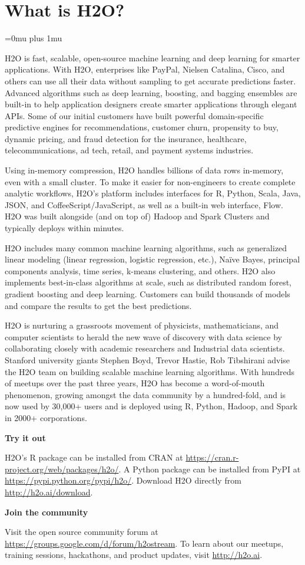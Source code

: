 \section{What is H2O?}
\Urlmuskip=0mu plus 1mu\relax %


H2O is fast, scalable, open-source machine learning and deep learning for smarter applications. With H2O, enterprises like PayPal, Nielsen Catalina, Cisco, and others can use all their data without sampling to get accurate predictions faster. Advanced algorithms such as deep learning, boosting, and bagging ensembles are built-in to help application designers create smarter applications through elegant APIs. Some of our initial customers have built powerful domain-specific predictive engines for recommendations, customer churn, propensity to buy, dynamic pricing, and fraud detection for the insurance, healthcare, telecommunications, ad tech, retail, and payment systems industries.

Using in-memory compression, H2O handles billions of data rows in-memory, even with a small cluster. To make it easier for non-engineers to create complete analytic workflows, H2O's platform includes interfaces for R, Python, Scala, Java, JSON, and CoffeeScript/JavaScript, as well as a built-in  web interface, Flow. H2O was built alongside (and on top of) Hadoop and Spark Clusters and typically deploys within minutes.

H2O includes many common machine learning algorithms, such as generalized linear modeling (linear regression, logistic regression, etc.), Na\"{i}ve Bayes, principal components analysis, time series, k-means clustering, and others. H2O also implements best-in-class algorithms at scale, such as distributed random forest, gradient boosting and deep learning. Customers can build thousands of models and compare the results to get the best predictions.

H2O is nurturing a grassroots movement of physicists, mathematicians, and computer scientists to herald the new wave of discovery with data science by collaborating closely with academic researchers and Industrial data scientists. Stanford university giants Stephen Boyd, Trevor Hastie, Rob Tibshirani advise the H2O team on building scalable machine learning algorithms. With hundreds of meetups over the past three years, H2O has become a word-of-mouth phenomenon, growing amongst the data community by a hundred-fold, and is now used by 30,000+ users and is deployed using R, Python, Hadoop, and Spark in 2000+ corporations.

\textbf{Try it out}

H2O's R package can be installed from CRAN at {\url{https://cran.r-project.org/web/packages/h2o/}}. A Python package can be installed from PyPI at {\url{https://pypi.python.org/pypi/h2o/}}. Download H2O directly from \mbox{\url{http://h2o.ai/download}}.

\textbf{Join the community}

Visit the open source community forum at {\url{https://groups.google.com/d/forum/h2ostream}}. To learn about our meetups, training sessions, hackathons, and product updates, visit {\url{http://h2o.ai}}. 

